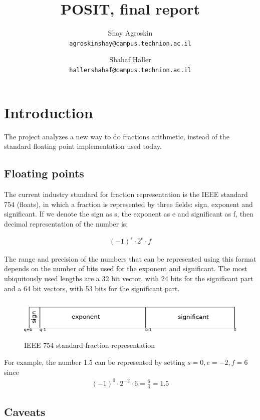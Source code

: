 \documentclass[10pt]{article}
\title{POSIT, final report}
\author{
  Shay Agroskin \\
  \texttt{agroskinshay@campus.technion.ac.il}
  \and
  Shahaf Haller \\
  \texttt{hallershahaf@campus.technion.ac.il}
}
\begin{document}
\maketitle

\section{Introduction}\label{sec:introduction}

The project analyzes a new way to do fractions arithmetic, instead of
the standard floating point implementation used today.

\subsection{Floating points}\label{sec:floatingpoints}

The current industry standard for fraction representation is the IEEE standard
754 (floats), in which a fraction is represented by three fields: sign, exponent
and significant. If we denote the sign as s, the exponent as e and significant
as f, then decimal representation of the number is:


\begin{align*}
  {(-1)}^{s} \cdot 2^{e} \cdot f\label{eq:1}
\end{align*}

The range and precision of the numbers that can be represented using this format
depends on the number of bits used for the exponent and significant. The most
ubiquitously used lengths are a 32 bit vector, with 24 bits for the significant
part and a 64 bit vectors, with 53 bits for the significant part.

\begin{figure}[h]
  \centering
  \includegraphics*[width=\textwidth, height=2cm]{ieee_754_format}
  \caption{IEEE 754 standard fraction representation}\label{fig:ieee754}
\end{figure}

For example, the number 1.5 can be represented by setting $s=0, e=-2, f=6$ since
\begin{align*}
  {(-1)}^{0} \cdot 2^{-2} \cdot 6 = \frac{6}{4} = 1.5
\end{align*}

\subsection{Caveats}\label{sec:floatscaveats}
\end{document}
